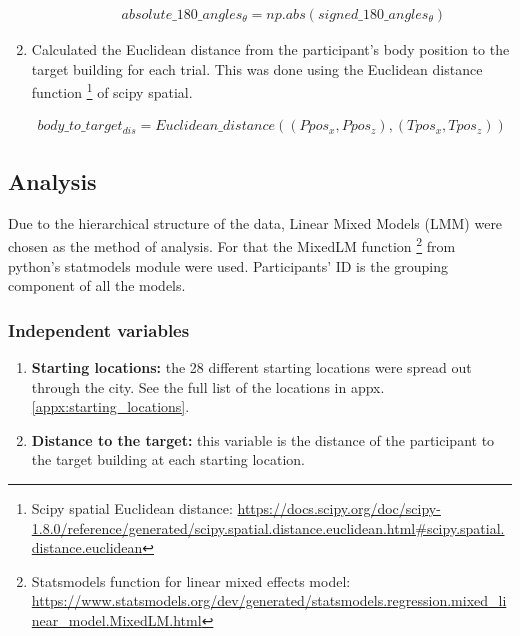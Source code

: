 \begin{enumerate}
\begin{enumerate}
		\begin{align*}
			absolute\_180\_angles_{\theta} = np.abs(signed\_180\_angles_{\theta})
		\end{align*}
		
	\end{enumerate}

	\item Calculated the Euclidean distance from the participant's body position to the target building for each trial. This was done using the Euclidean distance function \footnote{Scipy spatial Euclidean distance: \href{https://docs.scipy.org/doc/scipy-1.8.0/reference/generated/scipy.spatial.distance.euclidean.html\#scipy.spatial.distance.euclidean}{https://docs.scipy.org/doc/scipy-1.8.0/reference/generated/scipy.spatial.distance.euclidean.html\#scipy.spatial.distance.euclidean}} of scipy spatial.
	
	\begin{align*}
		body\_to\_target_{dis} = Euclidean\_distance((Ppos_x, Ppos_z), (Tpos_x, Tpos_z))
	\end{align*}

\end{enumerate}



\subsection{Analysis}
Due to the hierarchical structure of the data, Linear Mixed Models (LMM) were chosen as the method of analysis. For that the MixedLM function \footnote{Statsmodels function for linear mixed effects model: \\ \href{https://www.statsmodels.org/dev/generated/statsmodels.regression.mixed\_linear\_model.MixedLM.html}{https://www.statsmodels.org/dev/generated/statsmodels.regression.mixed\_linear\_model.MixedLM.html}} from python's statmodels module were used. Participants' ID is the grouping component of all the models.

\subsubsection{Independent variables}

\begin{enumerate}
	\item \textbf{Starting locations:} the 28 different starting locations were spread out through the city. See the full list of the locations in appx. \ref{appx:starting_locations}. \\
	
	\item \textbf{Distance to the target:} this variable is the distance of the participant to the target building at each starting location.
\end{enumerate}

